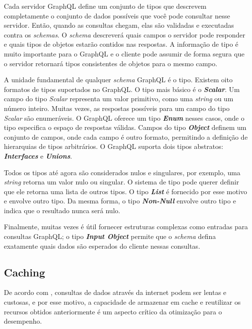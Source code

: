 Cada servidor GraphQL define um conjunto de tipos que descrevem completamente o conjunto de dados possíveis que você pode consultar nesse servidor. Então, quando as consultas chegam, elas são validadas e executadas contra os \textit{schemas}. O \textit{schema} descreverá quais campos o servidor pode responder e quais tipos de objetos estarão contidos nas respostas. A informação de tipo é muito importante para o GraphQL e o cliente pode assumir de forma segura que o servidor retornará tipos consistentes de objetos para o mesmo campo.

A unidade fundamental de qualquer \textit{schema} GraphQL é o tipo. Existem oito formatos de tipos suportados no GraphQL. O tipo mais básico é o \textit{\textbf{Scalar}}. Um campo do tipo \textit{Scalar} representa um valor primitivo, como uma \textit{string} ou um número inteiro. Muitas vezes, as respostas possíveis para um campo  do tipo \textit{Scalar} são enumeráveis. O GraphQL oferece um tipo \textit{\textbf{Enum}} nesses casos, onde o tipo especifica o espaço de respostas válidas. Campos do tipo \textit{\textbf{Object}} definem um conjunto de campos, onde cada campo é outro formato, permitindo a definição de hierarquias de tipos arbitrários. O GraphQL suporta dois tipos abstratos:  \textit{\textbf{Interfaces}} e  \textit{\textbf{Unions}}.

Todos os tipos até agora são considerados nulos e singulares, por exemplo,  uma \textit{string} retorna um valor nulo ou singular. O sistema de tipo pode querer definir que ele retorna uma lista de outros tipos. O tipo \textit{\textbf{List}} é fornecido por esse motivo e envolve outro tipo. Da mesma forma, o tipo \textit{\textbf{Non-Null}} envolve outro tipo e indica que o resultado nunca será nulo.

Finalmente, muitas vezes é útil fornecer estruturas complexas como entradas para consultas GraphQL; o tipo \textit{\textbf{Input Object}} permite que o \textit{schema} defina exatamente quais dados são esperados do cliente nessas consultas.

\subsection{Caching}

De acordo com , consultas de dados através da internet podem ser lentas e custosas, e por esse motivo, a capacidade de armazenar em cache e reutilizar os recursos obtidos anteriormente é um aspecto crítico da otimização para o desempenho.

